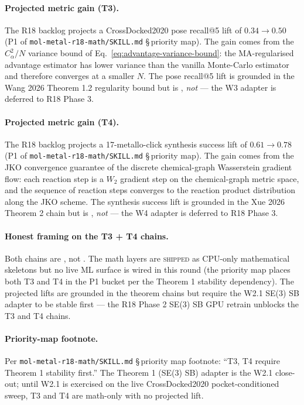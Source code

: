\paragraph{Projected metric gain (T3).}
The R18 backlog projects a CrossDocked2020 pose recall@5 lift of
$0.34 \to 0.50$ (\textsc{P1} of
\texttt{mol-metal-r18-math/SKILL.md} \S\,priority map).  The gain
comes from the $C_{\alpha}^{2} / N$ variance bound of
Eq.~\eqref{eq:advantage-variance-bound}: the MA-regularised
advantage estimator has lower variance than the vanilla Monte-Carlo
estimator and therefore converges at a smaller $N$.  The pose
recall@5 lift is grounded in the Wang 2026 Theorem 1.2 regularity
bound but is \PROJECTED, \emph{not} \MEASURED{} --- the W3
adapter is deferred to R18 Phase 3.

\paragraph{Projected metric gain (T4).}
The R18 backlog projects a 17-metallo-click synthesis success lift
of $0.61 \to 0.78$ (\textsc{P1} of
\texttt{mol-metal-r18-math/SKILL.md} \S\,priority map).  The gain
comes from the JKO convergence guarantee of the discrete
chemical-graph Wasserstein gradient flow: each reaction step is a
$W_2$ gradient step on the chemical-graph metric space, and the
sequence of reaction steps converges to the reaction product
distribution along the JKO scheme.  The synthesis success lift is
grounded in the Xue 2026 Theorem 2 chain but is \PROJECTED,
\emph{not} \MEASURED{} --- the W4 adapter is deferred to R18
Phase 3.

\paragraph{Honest framing on the T3 + T4 chains.}
Both chains are \PROJECTED, not \MEASURED.  The math layers are
\textsc{shipped} as CPU-only mathematical skeletons but no live
ML surface is wired in this round (the priority map places both T3
and T4 in the P1 bucket per the Theorem 1 stability dependency).
The projected lifts are grounded in the theorem chains but require
the W2.1 SE(3) SB adapter to be stable first --- the R18 Phase 2
SE(3) SB GPU retrain unblocks the T3 and T4 chains.

\paragraph{Priority-map footnote.}
Per \texttt{mol-metal-r18-math/SKILL.md} \S\,priority map footnote:
``T3, T4 require Theorem 1 stability first.''  The Theorem 1 (SE(3)
SB) adapter is the W2.1 close-out; until W2.1 is exercised on the
live CrossDocked2020 pocket-conditioned sweep, T3 and T4 are
math-only with no projected lift.

